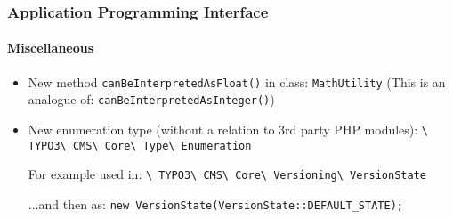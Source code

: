 \begin{frame}[fragile]
	\frametitle{Application Programming Interface}
	\framesubtitle{Miscellaneous}

	\begin{itemize}
		\item New method \texttt{canBeInterpretedAsFloat()} in class: \texttt{MathUtility}\newline
			\small(This is an analogue of: \texttt{canBeInterpretedAsInteger()})\normalsize
		\item New enumeration type (without a relation to 3rd party PHP modules):\newline
			\texttt{\textbackslash
				TYPO3\textbackslash
				CMS\textbackslash
				Core\textbackslash
				Type\textbackslash
				Enumeration}\newline

			For example used in:\newline
			\texttt{\textbackslash
				TYPO3\textbackslash
				CMS\textbackslash
				Core\textbackslash
				Versioning\textbackslash
				VersionState}\newline

			...and then as:\newline
			\texttt{new VersionState(VersionState::DEFAULT\_STATE);}

	\end{itemize}

\end{frame}


